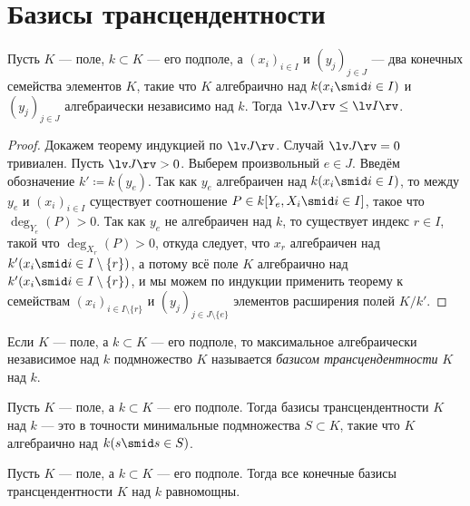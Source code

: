 \documentclass[
	extrafontsizes,
	11pt,
	hyphens,
]{memoir}
\begin{document}
\section{Базисы трансцендентности}

\begin{theorem}
Пусть \(K\) --- поле, \(k \subset K\) --- его подполе,
а \((x_i)_{i \in I}\) и \((y_j)_{j \in J}\) --- два конечных семейства элементов \(K\), такие что \(K\) алгебраично над \(k(x_i \smid i \in I)\) и \((y_j)_{j \in J}\) алгебраически независимо над \(k\).
\label{thm:TranscendenceBasesFundResult1}
Тогда \(\lv J \rv \leq \lv I \rv\).
\end{theorem}

\begin{proof}
Докажем теорему индукцией по \(\lv J \rv\).
Случай \(\lv J \rv = 0\) тривиален.
Пусть \(\lv J \rv > 0\).
Выберем произвольный \(e \in J\).
Введём обозначение \(k' \coloneqq k(y_e)\).
Так как \(y_e\) алгебраичен над \(k(x_i \smid i \in I)\), то между \(y_e\) и \((x_i)_{i \in I}\) существует соотношение \(P \in k[Y_e, X_i \smid i \in I]\), такое что \(\deg_{Y_e}(P) > 0\).
Так как \(y_e\) не алгебраичен над \(k\), то существует индекс \(r \in I\), такой что \(\deg_{X_r}(P) > 0\),
откуда следует, что \(x_r\) алгебраичен над \(k'(x_i \smid i \in I \setminus \{r\})\), а потому всё поле \(K\) алгебраично над \(k'(x_i \smid i \in I \setminus \{r\})\), и мы можем по индукции применить теорему к семействам \((x_i)_{i \in I \setminus \{r\}}\) и \((y_j)_{j \in J \setminus \{e\}}\) элементов расширения полей \(K / k'\).
\end{proof}

\begin{definition}
Если \(K\) --- поле, а \(k \subset K\) --- его подполе,
то максимальное алгебраически независимое над \(k\) подмножество \(K\) называется \emph{базисом трансцендентности} \(K\) над \(k\).
\end{definition}

\begin{observation}
Пусть \(K\) --- поле, а \(k \subset K\) --- его подполе.
Тогда базисы трансцендентности \(K\) над \(k\) --- это в точности минимальные подмножества \(S \subset K\), такие что \(K\) алгебраично над \(k(s \smid s \in S)\).
\end{observation}

\begin{theorem}
Пусть \(K\) --- поле, а \(k \subset K\) --- его подполе.
\label{thm:TranscendenceBasesFundResult2}
Тогда все конечные базисы трансцендентности \(K\) над \(k\) равномощны.
\end{theorem}
\end{document}
